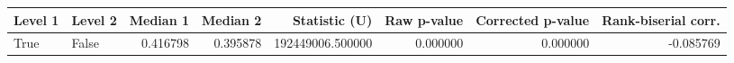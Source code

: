\begin{tabular}{llrrrrrr}
\toprule
Level 1 & Level 2 & Median 1 & Median 2 & Statistic (U) & Raw p-value & Corrected p-value & Rank-biserial corr. \\
\midrule
True & False & 0.416798 & 0.395878 & 192449006.500000 & 0.000000 & 0.000000 & -0.085769 \\
\bottomrule
\end{tabular}
